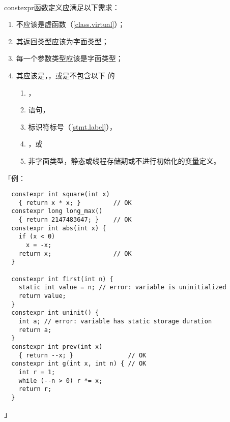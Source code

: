 \paragraph{}
constexpr函数定义应满足以下需求：
\begin{enumerate}
  \item{不应该是虚函数（\ref{class.virtual}）；}
  \item{其返回类型应该为字面类型；}
  \item{每一个参数类型应该是字面类型；}
  \item{其应该是，，或是不包含以下
    的
    \begin{enumerate}
      \item{，}
      \item{语句，}
      \item{标识符标号（\ref{stmt.label}），}
      \item{，或}
      \item{非字面类型，静态或线程存储期或不进行初始化的变量定义。}
    \end{enumerate}}
\end{enumerate}
「例：
\begin{lstlisting}
  constexpr int square(int x)
    { return x * x; }         // OK
  constexpr long long_max()
    { return 2147483647; }    // OK
  constexpr int abs(int x) {
    if (x < 0)
      x = -x;
    return x;                 // OK
  }

  constexpr int first(int n) {
    static int value = n; // error: variable is uninitialized
    return value;
  }
  constexpr int uninit() {
    int a; // error: variable has static storage duration
    return a;
  }
  constexpr int prev(int x)
    { return --x; }               // OK
  constexpr int g(int x, int n) { // OK
    int r = 1;
    while (--n > 0) r *= x;
    return r;
  }
\end{lstlisting}」

